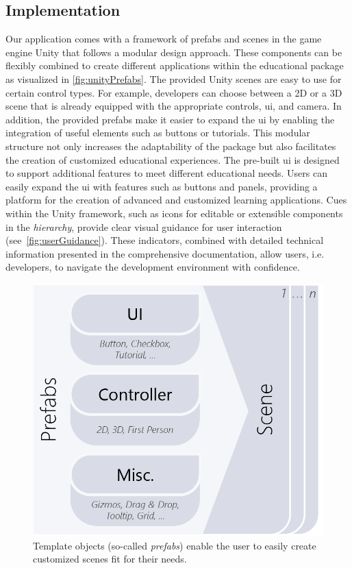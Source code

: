 \subsection{Implementation}

Our application comes with a framework of prefabs and scenes in the game engine Unity that follows a modular design approach. These components can be flexibly combined to create different applications within the educational package as visualized in \autoref{fig:unityPrefabs}. The provided Unity scenes are easy to use for certain control types. For example, developers can choose between a 2D or a 3D scene that is already equipped with the appropriate controls, \acrfull{ui}, and camera. In addition, the provided prefabs make it easier to expand the \acrshort{ui} by enabling the integration of useful elements such as buttons or tutorials. This modular structure not only increases the adaptability of the package but also facilitates the creation of customized educational experiences.
The pre-built \acrshort{ui} is designed to support additional features to meet different educational needs. Users can easily expand the \acrshort{ui} with features such as buttons and panels, providing a platform for the creation of advanced and customized learning applications.
Cues within the Unity framework, such as icons for editable or extensible components in the \emph{hierarchy}, provide clear visual guidance for user interaction (see~\autoref{fig:userGuidance}). These indicators, combined with detailed technical information presented in the comprehensive documentation, allow users, i.e. developers, to navigate the development environment with confidence.

\begin{figure}[tbh]
	\centering
	\includegraphics[width=0.6\linewidth]{pictures/unityPrefabs.png}
	\captionsetup{labelfont=bf,textfont=it}
	\caption[Structure of educational templates.]{Template objects (so-called \emph{prefabs}) enable the user to easily create customized scenes fit for their needs. \label{fig:unityPrefabs}}
\end{figure}

